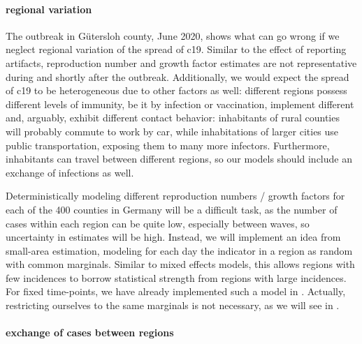
\paragraph{regional variation}
The outbreak in Gütersloh county, June 2020, shows what can go wrong if we neglect regional variation of the spread of \acrshort{c19}. Similar to the effect of reporting artifacts, reproduction number and growth factor estimates are  not representative during and shortly after the outbreak. Additionally, we would expect the spread of \acrshort{c19} to be heterogeneous due to other factors as well: different regions possess different levels of immunity, be it by infection or vaccination, implement different  and, arguably, exhibit different contact behavior: inhabitants of rural counties will probably commute to work by car, while inhabitations of larger cities use public transportation, exposing them to many more infectors. Furthermore, inhabitants can travel between different regions, so our models should include an exchange of infections as well. 

Deterministically modeling different reproduction numbers / growth factors for each of the 400 counties in Germany will be a difficult task, as the number of cases within each region can be quite low, especially between waves, so uncertainty in estimates will be high. Instead, we will implement an idea from small-area estimation, modeling for each day the indicator in a region as random with common marginals. Similar to mixed effects models, this allows regions with few incidences to \glqq{}borrow statistical strength\grqq{} from regions with large incidences. For fixed time-points, we have already implemented such a model in \citep{Burgard2021Regional}. Actually, restricting ourselves to the same marginals is not necessary, as we will see in . 

\paragraph{exchange of cases between regions}


